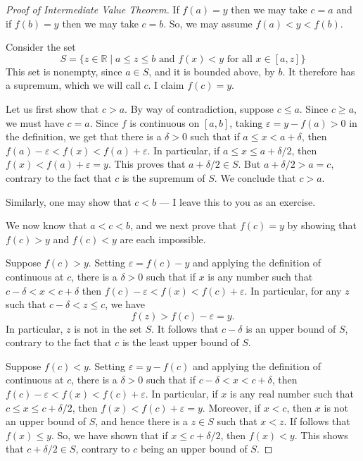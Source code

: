\documentclass[12pt]{amsart}
\def\d{\delta}
\def\e{\varepsilon}
\newcommand{\R}{{\mathbb{R}}}
\numberwithin{equation}{section}
\theoremstyle{plain} %
\theoremstyle{definition}
\theoremstyle{remark}
\begin{document}
\begin{enumerate}
\begin{framed}
\begin{proof}[Proof of Intermediate Value Theorem]
 If $f(a) = y$ then we may take $c = a$ and if $f(b) = y$ then we may take $c = b$. So, we may assume $f(a) < y < f(b)$.

Consider the set 
$$
S = \{z \in \R \mid a \leq z \leq b \text{ and $f(x) < y$ for all $x \in [a, z]$}\}
$$
This set is nonempty, since $a \in S$, and it is bounded above, by $b$. It therefore has a supremum,
which we will call $c$. I claim $f(c) = y$.





Let us first show that $c > a$. By way of contradiction, suppose $c \leq a$. Since $c \geq a$, we must have $c = a$. 
Since $f$ is continuous on $[a,b]$, taking $\e = y
- f(a) > 0$ in the definition, we get that there is a $\d>0$ such that if $a \leq x < a +
\d$, then $f(a) - \e < f(x) < f(a) + \e$. In particular, if $a \leq x \leq a + \d/2$, then $f(x) < f(a) + \e = y$.
This proves that $a+ \d/2 \in S$. But $a + \d/2 > a = c$, contrary to the fact that $c$ is the supremum of $S$. We conclude that $c > a$. 


Similarly, one may show that $c < b$ --- I leave this to you as an exercise.

We now know that $a < c < b$, and 
we next prove that $f(c) = y$ by showing that $f(c) > y$ and $f(c) < y$ are each impossible.

Suppose $f(c) > y$. 
Setting $\e = f(c) - y$ and applying the definition of continuous at $c$, there is a $\d >0$ such that if $x$ is any number such that $c
- \d < x < c + \d$ then $f(c) - \e < f(x) < f(c) + \e$. In particular, for any $z$ such that $c - \d < z \leq c$, 
we have
$$
f(z) > f(c) - \e = y.
$$
In particular, $z$ is not in the set $S$. It follows that $c - \d$ is an upper bound of $S$, contrary to the fact that $c$ is the least upper bound of $S$. 



Suppose $f(c) < y$. 
Setting $\e = y - f(c)$ and applying the definition of continuous at $c$, there is a $\d >0$ such that if $c - \d < x < c + \d$, 
then $f(c) - \e < f(x) < f(c) + \e$. In particular, 
if $x$ is any real number such that $c \leq x \leq c + \d/2$, then $f(x) < f(c) + \e = y$. Moreover, if $x < c$, then $x$ is not an upper bound of $S$, and hence there is a $z \in
S$ such that $x < z$. If follows that $f(x) \leq y$.
So, we have shown that if $x \leq c + \d/2$, then $f(x) < y$. This shows that
 $c + \d/2 \in S$, contrary to $c$ being an upper bound of $S$. 
 \end{proof}
\end{framed}
\end{enumerate}
\end{document}
